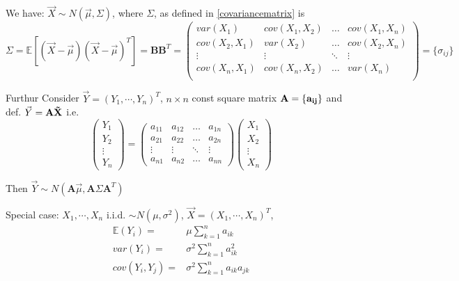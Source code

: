     
    We have: $\vec{X}\sim N(\vec{\mu},\Sigma)$, where $\Sigma$, as defined in \autoref{covariancematrix} is
    \begin{equation}
        \Sigma=\mathbb{E}[(\vec{X}-\vec{\mu})(\vec{X}-\vec{\mu})^T]=\bm{BB}^T=
        \begin{pmatrix}
        var(X_1) & cov(X_1,X_2) & \ldots & cov(X_1,X_n)\\
        cov(X_2,X_1) & var(X_2) & \ldots & cov(X_2,X_n)\\
        \vdots & \vdots & \ddots & \vdots\\
        cov(X_n,X_1) & cov(X_n,X_2) & \ldots & var(X_n)\\
        \end{pmatrix}  
        =\{\sigma_{ij}\}  
    \end{equation}

    Furthur Consider $\vec{Y}=(Y_1,\cdots,Y_n)^T$, $n\times n$ const square matrix $\bf{A}=\{a_{ij}\}$ and def. $\vec{Y}=\bf{A}\vec{X}$ i.e.
    \begin{equation}
        \begin{pmatrix}
            Y_1\\
            Y_2\\
            \vdots\\
            Y_n
        \end{pmatrix}
        =
        \begin{pmatrix}
            a_{11}&a_{12}&\ldots&a_{1n}\\
            a_{21}&a_{22}&\ldots&a_{2n}\\
            \vdots&\vdots&\ddots&\vdots\\
            a_{n1}&a_{n2}&\ldots&a_{nn}
        \end{pmatrix}
        \begin{pmatrix}
            X_1\\
            X_2\\
            \vdots\\
            X_n
        \end{pmatrix}
    \end{equation}

    Then $\vec{Y}\sim N(\bm{A}\vec{\mu},\bm{A}\Sigma\bm{A}^T)$

    Special case: $X_1,\cdots,X_n$ i.i.d. $\sim N(\mu,\sigma^2)$, $\vec{X}=(X_1,\cdots,X_n)^T$, 
    \begin{align}
        \mathbb{E}(Y_i)=&\mu\sum_{k=1}^n a_{ik}\\
        var(Y_i)=&\sigma^2\sum_{k=1}^n a_{ik}^2\\
        cov(Y_i,Y_j)=&\sigma^2\sum_{k=1}^n a_{ik} a_{jk}
    \end{align}

